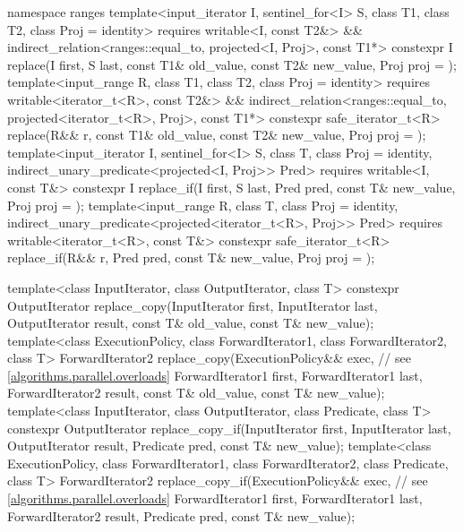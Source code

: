 \begin{codeblock}
{  namespace ranges {
    template<input_iterator I, sentinel_for<I> S, class T1, class T2, class Proj = identity>
      requires writable<I, const T2&> &&
               indirect_relation<ranges::equal_to, projected<I, Proj>, const T1*>
      constexpr I
        replace(I first, S last, const T1& old_value, const T2& new_value, Proj proj = {});
    template<input_range R, class T1, class T2, class Proj = identity>
      requires writable<iterator_t<R>, const T2&> &&
               indirect_relation<ranges::equal_to, projected<iterator_t<R>, Proj>, const T1*>
      constexpr safe_iterator_t<R>
        replace(R&& r, const T1& old_value, const T2& new_value, Proj proj = {});
    template<input_iterator I, sentinel_for<I> S, class T, class Proj = identity,
             indirect_unary_predicate<projected<I, Proj>> Pred>
      requires writable<I, const T&>
      constexpr I replace_if(I first, S last, Pred pred, const T& new_value, Proj proj = {});
    template<input_range R, class T, class Proj = identity,
             indirect_unary_predicate<projected<iterator_t<R>, Proj>> Pred>
      requires writable<iterator_t<R>, const T&>
      constexpr safe_iterator_t<R>
        replace_if(R&& r, Pred pred, const T& new_value, Proj proj = {});
  }

  template<class InputIterator, class OutputIterator, class T>
    constexpr OutputIterator replace_copy(InputIterator first, InputIterator last,
                                          OutputIterator result,
                                          const T& old_value, const T& new_value);
  template<class ExecutionPolicy, class ForwardIterator1, class ForwardIterator2, class T>
    ForwardIterator2 replace_copy(ExecutionPolicy&& exec,       // see \ref{algorithms.parallel.overloads}
                                  ForwardIterator1 first, ForwardIterator1 last,
                                  ForwardIterator2 result,
                                  const T& old_value, const T& new_value);
  template<class InputIterator, class OutputIterator, class Predicate, class T>
    constexpr OutputIterator replace_copy_if(InputIterator first, InputIterator last,
                                             OutputIterator result,
                                             Predicate pred, const T& new_value);
  template<class ExecutionPolicy, class ForwardIterator1, class ForwardIterator2,
           class Predicate, class T>
    ForwardIterator2 replace_copy_if(ExecutionPolicy&& exec,    // see \ref{algorithms.parallel.overloads}
                                     ForwardIterator1 first, ForwardIterator1 last,
                                     ForwardIterator2 result,
                                     Predicate pred, const T& new_value);

}
\end{codeblock}
